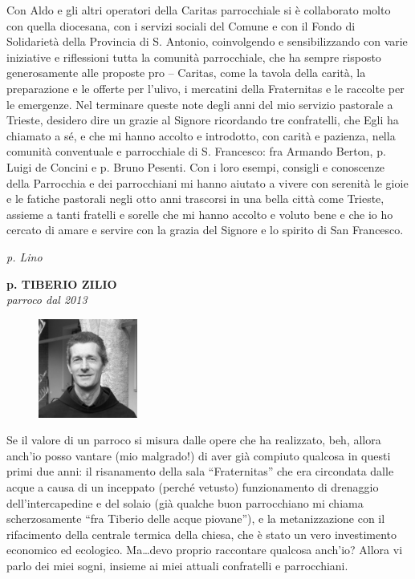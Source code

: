 Con Aldo e gli altri operatori della Caritas parrocchiale si è collaborato molto con quella diocesana, 
con i servizi sociali del Comune e con il Fondo di Solidarietà della Provincia di S. Antonio, 
coinvolgendo e sensibilizzando con varie iniziative e riflessioni tutta la comunità parrocchiale, che 
ha sempre risposto generosamente alle proposte pro – Caritas, come la tavola della carità, la 
preparazione e le offerte per l'ulivo, i mercatini della Fraternitas e le raccolte per le emergenze.
Nel  terminare queste note degli anni del mio servizio pastorale a Trieste, desidero dire un 
grazie al Signore ricordando tre confratelli, che Egli ha chiamato a sé, e che mi hanno accolto e 
introdotto, con carità e pazienza, nella comunità conventuale e parrocchiale di S. Francesco: fra 
Armando Berton, p. Luigi de Concini e p. Bruno Pesenti.
Con i loro esempi, consigli e conoscenze della Parrocchia e dei parrocchiani mi hanno aiutato a 
vivere con serenità le gioie e le fatiche pastorali negli otto anni trascorsi in una bella città come 
Trieste, assieme a tanti fratelli e sorelle che mi hanno accolto e voluto bene e che io ho cercato di 
amare e servire con la grazia del Signore e lo spirito di San Francesco. 
\begin{flushright}
\textit{p. Lino}
\end{flushright}
\endgroup
\newpage
\begin{center}
\textbf{\Large p. TIBERIO ZILIO}\\
	\textit{parroco dal 2013}
\end{center}
\bigbreak
\begingroup
\setlength\intextsep{0pt}
\begin{figure}
\centering
\includegraphics[width=0.29\textwidth]{immagini/tiberio.jpg}
\end{figure}
\noindent Se il valore di un parroco si misura dalle opere che ha realizzato, beh, allora anch’io posso
vantare (mio malgrado!) di aver già compiuto qualcosa in questi primi due anni: il risanamento 
della sala ``Fraternitas'' che era circondata dalle acque a causa di un inceppato (perché vetusto) 
funzionamento di drenaggio dell’intercapedine e del solaio (già qualche buon parrocchiano mi 
chiama scherzosamente ``fra Tiberio delle acque piovane''), e la metanizzazione con il rifacimento 
della centrale termica della chiesa, che è stato un vero investimento economico ed ecologico. 
Ma…devo proprio raccontare qualcosa anch’io? Allora vi parlo dei miei sogni, insieme ai miei 
attuali confratelli e parrocchiani. 

